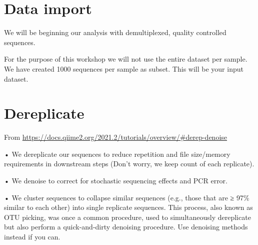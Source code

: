 \documentclass[
]{book}
\newenvironment{Shaded}{\begin{snugshade}}{\end{snugshade}}
\newcommand{\BuiltInTok}[1]{#1}
\newcommand{\CommentTok}[1]{\textcolor[rgb]{0.56,0.35,0.01}{\textit{#1}}}
\newcommand{\DataTypeTok}[1]{\textcolor[rgb]{0.13,0.29,0.53}{#1}}
\newcommand{\ExtensionTok}[1]{#1}
\newcommand{\FunctionTok}[1]{\textcolor[rgb]{0.00,0.00,0.00}{#1}}
\newcommand{\NormalTok}[1]{#1}
\newcommand{\StringTok}[1]{\textcolor[rgb]{0.31,0.60,0.02}{#1}}
\newcommand{\VariableTok}[1]{\textcolor[rgb]{0.00,0.00,0.00}{#1}}
\begin{document}
\hypertarget{data-import}{%
\section{Data import}\label{data-import}}

We will be beginning our analysis with demultiplexed, quality controlled sequences.

For the purpose of this workshop we will not use the entire dataset per sample. We have created 1000 sequences per sample as subset. This will be your input dataset.

\begin{Shaded}
\end{Shaded}

\hypertarget{dereplicate}{%
\section{Dereplicate}\label{dereplicate}}

From \url{https://docs.qiime2.org/2021.2/tutorials/overview/\#derep-denoise}

• We dereplicate our sequences to reduce repetition and file size/memory requirements in downstream steps (Don't worry, we keep count of each replicate).

• We denoise to correct for stochastic sequencing effects and PCR error.

• We cluster sequences to collapse similar sequences (e.g., those that are ≥ 97\% similar to each other) into single replicate sequences. This process, also known as OTU picking, was once a common procedure, used to simultaneously dereplicate but also perform a quick-and-dirty denoising procedure. Use denoising methods instead if you can.
\end{document}
